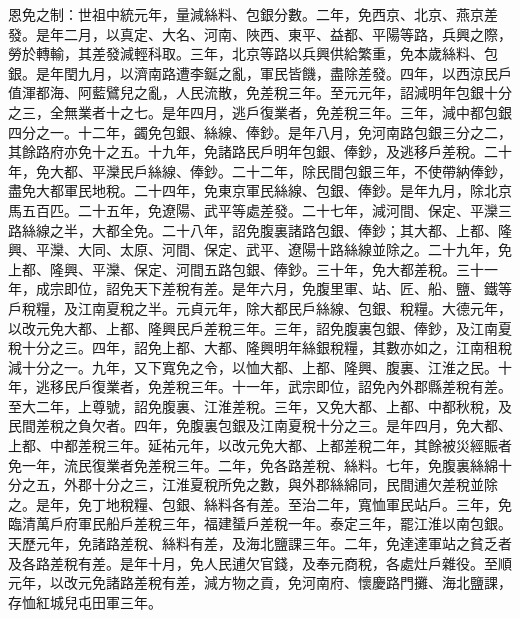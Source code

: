 \begin{pinyinscope}
 恩免之制：世祖中統元年，量減絲料、包銀分數。二年，免西京、北京、燕京差發。是年二月，以真定、大名、河南、陜西、東平、益都、平陽等路，兵興之際，勞於轉輸，其差發減輕科取。三年，北京等路以兵興供給繁重，免本歲絲料、包銀。是年閏九月，以濟南路遭李鋋之亂，軍民皆饑，盡除差發。四年，以西涼民戶值渾都海、阿藍鷿兒之亂，人民流散，免差稅三年。至元元年，詔減明年包銀十分之三，全無業者十之七。是年四月，逃戶復業者，免差稅三年。三年，減中都包銀四分之一。十二年，蠲免包銀、絲線、俸鈔。是年八月，免河南路包銀三分之二，其餘路府亦免十之五。十九年，免諸路民戶明年包銀、俸鈔，及逃移戶差稅。二十年，免大都、平灤民戶絲線、俸鈔。二十二年，除民間包銀三年，不使帶納俸鈔，盡免大都軍民地稅。二十四年，免東京軍民絲線、包銀、俸鈔。是年九月，除北京馬五百匹。二十五年，免遼陽、武平等處差發。二十七年，減河間、保定、平灤三路絲線之半，大都全免。二十八年，詔免腹裏諸路包銀、俸鈔；其大都、上都、隆興、平灤、大同、太原、河間、保定、武平、遼陽十路絲線並除之。二十九年，免上都、隆興、平灤、保定、河間五路包銀、俸鈔。三十年，免大都差稅。三十一年，成宗即位，詔免天下差稅有差。是年六月，免腹里軍、站、匠、船、鹽、鐵等戶稅糧，及江南夏稅之半。元貞元年，除大都民戶絲線、包銀、稅糧。大德元年，以改元免大都、上都、隆興民戶差稅三年。三年，詔免腹裏包銀、俸鈔，及江南夏稅十分之三。四年，詔免上都、大都、隆興明年絲銀稅糧，其數亦如之，江南租稅減十分之一。九年，又下寬免之令，以恤大都、上都、隆興、腹裏、江淮之民。十年，逃移民戶復業者，免差稅三年。十一年，武宗即位，詔免內外郡縣差稅有差。至大二年，上尊號，詔免腹裏、江淮差稅。三年，又免大都、上都、中都秋稅，及民間差稅之負欠者。四年，免腹裏包銀及江南夏稅十分之三。是年四月，免大都、上都、中都差稅三年。延祐元年，以改元免大都、上都差稅二年，其餘被災經賑者免一年，流民復業者免差稅三年。二年，免各路差稅、絲料。七年，免腹裏絲綿十分之五，外郡十分之三，江淮夏稅所免之數，與外郡絲綿同，民間逋欠差稅並除之。是年，免丁地稅糧、包銀、絲料各有差。至治二年，寬恤軍民站戶。三年，免臨清萬戶府軍民船戶差稅三年，福建蜑戶差稅一年。泰定三年，罷江淮以南包銀。天歷元年，免諸路差稅、絲料有差，及海北鹽課三年。二年，免達達軍站之貧乏者及各路差稅有差。是年十月，免人民逋欠官錢，及奉元商稅，各處灶戶雜役。至順元年，以改元免諸路差稅有差，減方物之貢，免河南府、懷慶路門攤、海北鹽課，存恤紅城兒屯田軍三年。




\end{pinyinscope}
